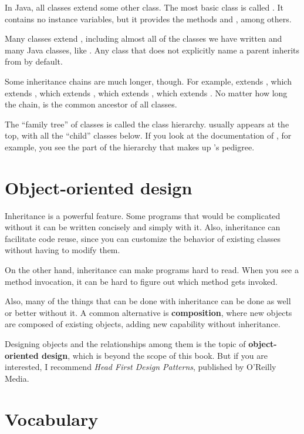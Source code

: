 In Java, all classes extend some other class.
The most basic class is called .
It contains no instance variables, but it provides the methods  and , among others.

Many classes extend , including almost all of the classes we have written and many Java classes, like .
Any class that does not explicitly name a parent inherits from  by default.

Some inheritance chains are much longer, though.
For example,  extends , which extends , which extends , which extends , which extends .
No matter how long the chain,  is the common ancestor of all classes.

The ``family tree'' of classes is called the class hierarchy.
 usually appears at the top, with all the ``child'' classes below.
If you look at the documentation of , for example, you see the part of the hierarchy that makes up 's pedigree.


\section{Object-oriented design}

Inheritance is a powerful feature.
Some programs that would be complicated without it can be written concisely and simply with it.
Also, inheritance can facilitate code reuse, since you can customize the behavior of existing classes without having to modify them.

On the other hand, inheritance can make programs hard to read.
When you see a method invocation, it can be hard to figure out which method gets invoked.

Also, many of the things that can be done with inheritance can be done as well or better without it.
A common alternative is {\bf composition}, where new objects are composed of existing objects, adding new capability without inheritance.

Designing objects and the relationships among them is the topic of {\bf object-oriented design}, which is beyond the scope of this book.
But if you are interested, I recommend {\em Head First Design Patterns}, published by O'Reilly Media.


\section{Vocabulary}

